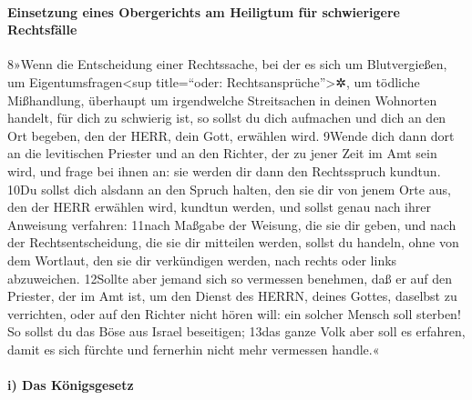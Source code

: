 \hypertarget{einsetzung-eines-obergerichts-am-heiligtum-fuxfcr-schwierigere-rechtsfuxe4lle}{%
\paragraph{Einsetzung eines Obergerichts am Heiligtum für schwierigere
Rechtsfälle}\label{einsetzung-eines-obergerichts-am-heiligtum-fuxfcr-schwierigere-rechtsfuxe4lle}}

8»Wenn die Entscheidung einer Rechtssache, bei der es sich um
Blutvergießen, um Eigentumsfragen\textless sup title=``oder:
Rechtsansprüche''\textgreater✲, um tödliche Mißhandlung, überhaupt um
irgendwelche Streitsachen in deinen Wohnorten handelt, für dich zu
schwierig ist, so sollst du dich aufmachen und dich an den Ort begeben,
den der HERR, dein Gott, erwählen wird. 9Wende dich dann dort an die
levitischen Priester und an den Richter, der zu jener Zeit im Amt sein
wird, und frage bei ihnen an: sie werden dir dann den Rechtsspruch
kundtun. 10Du sollst dich alsdann an den Spruch halten, den sie dir von
jenem Orte aus, den der HERR erwählen wird, kundtun werden, und sollst
genau nach ihrer Anweisung verfahren: 11nach Maßgabe der Weisung, die
sie dir geben, und nach der Rechtsentscheidung, die sie dir mitteilen
werden, sollst du handeln, ohne von dem Wortlaut, den sie dir
verkündigen werden, nach rechts oder links abzuweichen. 12Sollte aber
jemand sich so vermessen benehmen, daß er auf den Priester, der im Amt
ist, um den Dienst des HERRN, deines Gottes, daselbst zu verrichten,
oder auf den Richter nicht hören will: ein solcher Mensch soll sterben!
So sollst du das Böse aus Israel beseitigen; 13das ganze Volk aber soll
es erfahren, damit es sich fürchte und fernerhin nicht mehr vermessen
handle.«

\hypertarget{i-das-kuxf6nigsgesetz}{%
\paragraph{i) Das Königsgesetz}\label{i-das-kuxf6nigsgesetz}}

